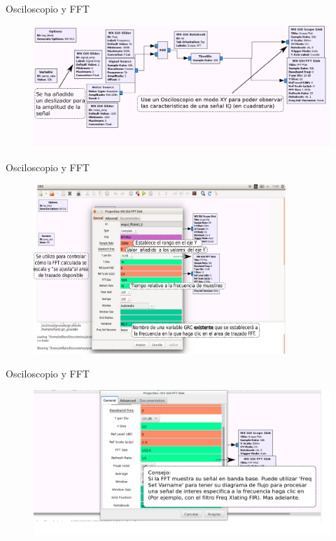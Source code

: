 \begin{frame}{Osciloscopio y FFT}
\begin{figure}[H]
\vspace{-4mm}
\centering
\includegraphics[width=1.1\textwidth]{lab2/pdf/lab2_6.pdf}
\end{figure}
\end{frame}

\begin{frame}{Osciloscopio y FFT}
\begin{figure}[H]
\vspace{-4mm}
\centering
\includegraphics[width=0.85\textwidth]{lab2/pdf/lab2_7.pdf}
\end{figure}
\end{frame}

\begin{frame}{Osciloscopio y FFT}
\begin{figure}[H]
\centering
\includegraphics[width=1.1\textwidth]{lab2/pdf/lab2_8.pdf}
\end{figure}
\end{frame}

